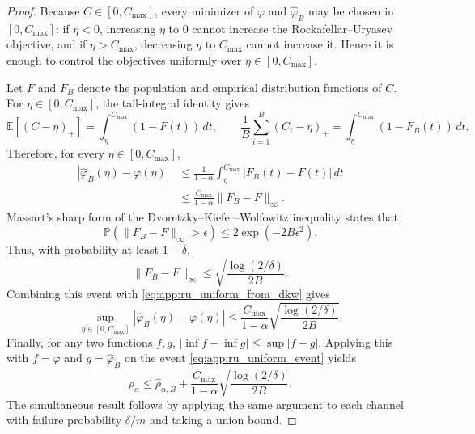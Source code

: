 \begin{proof}
Because $C\in[0,C_{\max}]$, every minimizer of $\varphi$ and
$\widehat\varphi_B$ may be chosen in $[0,C_{\max}]$: if $\eta<0$, increasing
$\eta$ to $0$ cannot increase the Rockafellar--Uryasev objective, and if
$\eta>C_{\max}$, decreasing $\eta$ to $C_{\max}$ cannot increase it. Hence it is
enough to control the objectives uniformly over $\eta\in[0,C_{\max}]$.

Let $F$ and $F_B$ denote the population and empirical distribution functions of
$C$. For $\eta\in[0,C_{\max}]$, the tail-integral identity gives
\begin{equation}
    \mathbb E[(C-\eta)_+]
    =
    \int_\eta^{C_{\max}}(1-F(t))\,dt,
    \qquad
    \frac1B\sum_{i=1}^B(C_i-\eta)_+
    =
    \int_\eta^{C_{\max}}(1-F_B(t))\,dt .
    \label{eq:app:tail_integral_identity}
\end{equation}
Therefore, for every $\eta\in[0,C_{\max}]$,
\begin{align}
    |\widehat\varphi_B(\eta)-\varphi(\eta)|
    &\le
    \frac{1}{1-\alpha}
    \int_\eta^{C_{\max}}|F_B(t)-F(t)|\,dt \\
    &\le
    \frac{C_{\max}}{1-\alpha}
    \|F_B-F\|_\infty .
    \label{eq:app:ru_uniform_from_dkw}
\end{align}
Massart's sharp form of the Dvoretzky--Kiefer--Wolfowitz inequality states that
\citep{DvoretzkyKieferWolfowitz1956,Massart1990}
\begin{equation}
    \mathbb P\!\left(\|F_B-F\|_\infty>\epsilon\right)
    \le
    2\exp(-2B\epsilon^2).
\end{equation}
Thus, with probability at least $1-\delta$,
\[
    \|F_B-F\|_\infty
    \le
    \sqrt{\frac{\log(2/\delta)}{2B}} .
\]
Combining this event with \eqref{eq:app:ru_uniform_from_dkw} gives
\begin{equation}
    \sup_{\eta\in[0,C_{\max}]}
    |\widehat\varphi_B(\eta)-\varphi(\eta)|
    \le
    \frac{C_{\max}}{1-\alpha}
    \sqrt{\frac{\log(2/\delta)}{2B}} .
    \label{eq:app:ru_uniform_event}
\end{equation}
Finally, for any two functions $f,g$, $|\inf f-\inf g|\le\sup|f-g|$. Applying this
with $f=\varphi$ and $g=\widehat\varphi_B$ on the event
\eqref{eq:app:ru_uniform_event} yields
\[
    \rho_\alpha
    \le
    \widehat\rho_{\alpha,B}
    +
    \frac{C_{\max}}{1-\alpha}
    \sqrt{\frac{\log(2/\delta)}{2B}} .
\]
The simultaneous result follows by applying the same argument to each channel with
failure probability $\delta/m$ and taking a union bound.
\end{proof}


